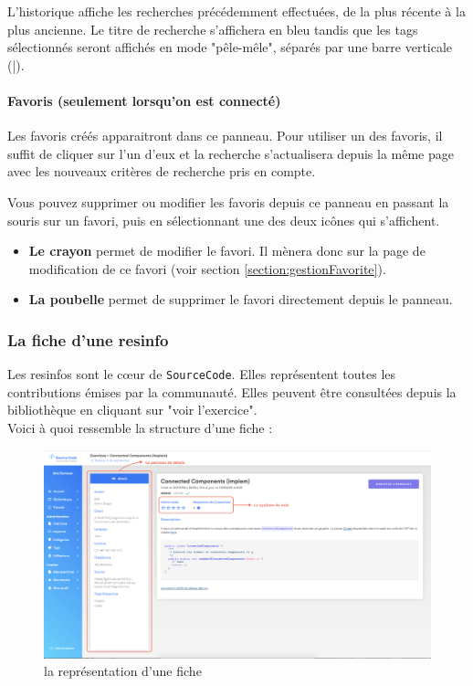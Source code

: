 L'historique affiche les recherches précédemment effectuées, de la plus récente à la plus ancienne. Le titre de recherche s'affichera en bleu tandis que les \glspl{tag} sélectionnés seront affichés en mode "pêle-mêle", séparés par une barre verticale (|).\\

\paragraph{Favoris (seulement lorsqu'on est connecté)} Les favoris créés apparaitront dans ce panneau. Pour utiliser un des favoris, il suffit de cliquer sur l'un d'eux et la recherche s'actualisera depuis la même page avec les nouveaux critères de recherche pris en compte.

Vous pouvez supprimer ou modifier les favoris depuis ce panneau en passant la souris sur un favori, puis en sélectionnant une des deux icônes qui s'affichent.

\begin{itemize}
    \item \textbf{Le crayon} permet de modifier le favori. Il mènera donc sur la page de modification de ce favori (voir section \ref{section:gestionFavorite}).
    \item \textbf{La poubelle} permet de supprimer le favori directement depuis le panneau.
\end{itemize}

\subsubsection{La \gls{fiche} d’une \gls{resinfo}}
\label{section:ficheResInfo}

Les \glspl{resinfo} sont le cœur de \texttt{SourceCode}. Elles représentent toutes les contributions émises par la communauté. Elles peuvent être consultées depuis la bibliothèque en cliquant sur "voir l'exercice".\\

Voici à quoi ressemble la structure d'une \gls{fiche} :

\begin{figure}[H]
    \includegraphics[width=\textwidth,height=\textheight,keepaspectratio]{images/client/fiche.png}
    \centering
    \caption[SourceCode : la représentation d'une \gls{fiche}]{la représentation d'une \gls{fiche}}
\end{figure}

